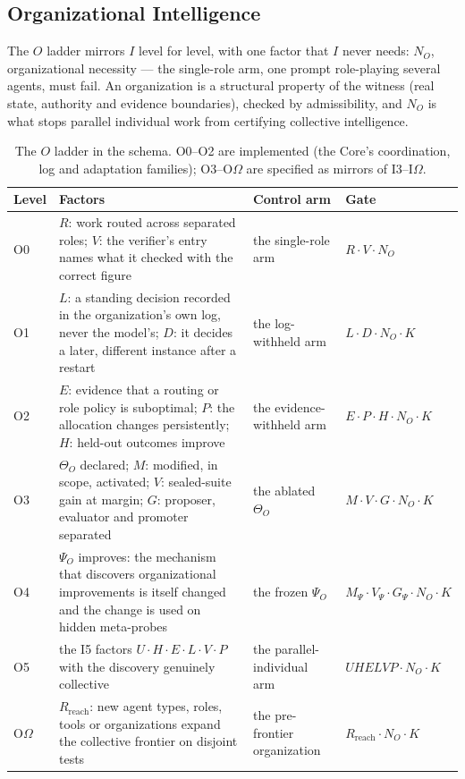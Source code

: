 \documentclass[11pt]{article}
\theoremstyle{definition}
\newcommand{\Om}{\ensuremath{\Omega}}
\begin{document}
\subsection{Organizational Intelligence}
The $O$ ladder mirrors $I$ level for level, with one factor that $I$ never needs: $N_O$, organizational necessity --- the single-role arm, one prompt role-playing several agents, must fail. An organization is a structural property of the witness (real state, authority and evidence boundaries), checked by admissibility, and $N_O$ is what stops parallel individual work from certifying collective intelligence.
\begin{table}[!htbp]
\centering\small
\begin{tabularx}{\textwidth}{@{}lYYl@{}}
\toprule
Level & Factors & Control arm & Gate \\
\midrule
O0 & $R$: work routed across separated roles; $V$: the verifier's entry names what it checked with the correct figure & the single-role arm & $R\cdot V\cdot N_O$ \\
O1 & $L$: a standing decision recorded in the organization's own log, never the model's; $D$: it decides a later, different instance after a restart & the log-withheld arm & $L\cdot D\cdot N_O\cdot K$ \\
O2 & $E$: evidence that a routing or role policy is suboptimal; $P$: the allocation changes persistently; $H$: held-out outcomes improve & the evidence-withheld arm & $E\cdot P\cdot H\cdot N_O\cdot K$ \\
O3 & $\Theta_O$ declared; $M$: modified, in scope, activated; $V$: sealed-suite gain at margin; $G$: proposer, evaluator and promoter separated & the ablated $\Theta_O$ & $M\cdot V\cdot G\cdot N_O\cdot K$ \\
O4 & $\Psi_O$ improves: the mechanism that discovers organizational improvements is itself changed and the change is used on hidden meta-probes & the frozen $\Psi_O$ & $M_{\Psi}\cdot V_{\Psi}\cdot G_{\Psi}\cdot N_O\cdot K$ \\
O5 & the I5 factors $U\cdot H\cdot E\cdot L\cdot V\cdot P$ with the discovery genuinely collective & the parallel-individual arm & $U H E L V P\cdot N_O\cdot K$ \\
O\Om{} & $R_{\mathrm{reach}}$: new agent types, roles, tools or organizations expand the collective frontier on disjoint tests & the pre-frontier organization & $R_{\mathrm{reach}}\cdot N_O\cdot K$ \\
\bottomrule
\end{tabularx}
\caption{The $O$ ladder in the schema. O0--O2 are implemented (the Core's coordination, log and adaptation families); O3--O\Om{} are specified as mirrors of I3--I\Om{}.}
\label{tab:ostyle}
\end{table}
\end{document}
